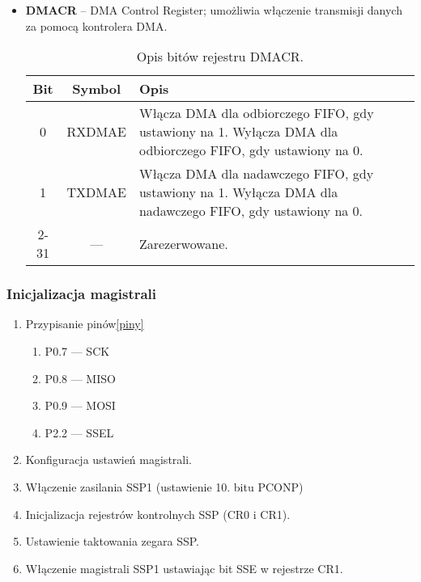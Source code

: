 \begin{itemize}
  \item \textbf{DMACR} – DMA Control Register; umożliwia włączenie transmisji danych za pomocą kontrolera DMA.

\begin{table}[H]
\centering
\caption{Opis bitów rejestru DMACR.}
\vspace{0.5em}
\renewcommand{\arraystretch}{1.2}
\begin{tabular}{|c|c|p{10cm}|}
\hline
\textbf{Bit} & \textbf{Symbol} & \textbf{Opis} \\
\hline
0 & RXDMAE & Włącza DMA dla odbiorczego FIFO, gdy ustawiony na 1. Wyłącza DMA dla odbiorczego FIFO, gdy ustawiony na 0. \\
\hline
1 & TXDMAE & Włącza DMA dla nadawczego FIFO, gdy ustawiony na 1. Wyłącza DMA dla nadawczego FIFO, gdy ustawiony na 0. \\
\hline
2-31 & — & Zarezerwowane. \\
\hline
\end{tabular}
\end{table}

  
\end{itemize}

\subsubsection{Inicjalizacja magistrali}
\begin{enumerate}
    \item Przypisanie pinów\ref{piny}
    \begin{enumerate}
        \item P0.7 — SCK
        \item P0.8 — MISO
        \item P0.9 — MOSI
        \item P2.2 — SSEL
    \end{enumerate}
    \item Konfiguracja ustawień magistrali.
    \item Włączenie zasilania SSP1 (ustawienie 10. bitu PCONP)
    \item Inicjalizacja rejestrów kontrolnych SSP (CR0 i CR1).
    \item Ustawienie taktowania zegara SSP.
    \item Włączenie magistrali SSP1 ustawiając bit SSE w rejestrze CR1.
\end{enumerate}

